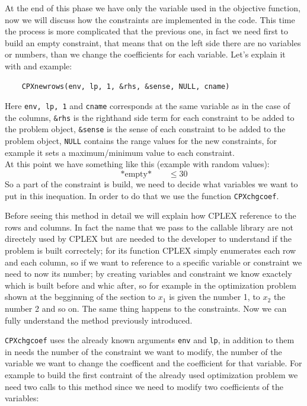At the end of this phase we have only the variable used in the objective function, now we will discuss how the constraints are implemented in the code. This time the process is more complicated that the previous one, in fact we need first to build an empty constraint, that means that on the left side there are no variables or numbers, than we change the coefficients for each variable. Let's explain it with and example:

\begin{lstlisting}
	CPXnewrows(env, lp, 1, &rhs, &sense, NULL, cname)
\end{lstlisting}

Here \verb|env, lp, 1| and \verb|cname| corresponds at the same variable as in the case of the columns, \verb|&rhs| is the righthand side term for each constraint to be added to the problem object, \verb|&sense| is the sense of each constraint to be added to the problem object, \verb|NULL| contains the range values for the new constraints, for example it sets a maximum/minimum value to each constraint.\\
At this point we have something like this (example with random values):
\[ \text{*empty*} \qquad \le 30\]
So a part of the constraint is build, we need to decide what variables we want to put in this inequation. In order to do that we use the function \verb|CPXchgcoef|. 

Before seeing this method in detail we will explain how CPLEX reference to the rows and columns. In fact the name that we pass to the callable library are not directely used by CPLEX but are needed to the developer to understand if the problem is built correctely; for its function CPLEX simply enumerates each row and each column, so if we want to reference to a specific variable or constraint we need to now its number; by creating variables and constraint we know exactely which is built before and whic after, so for example in the optimization problem shown at the begginning of the section to $x_1$ is given the number 1, to $x_2$ the number 2 and so on. The same thing happens to the constraints. Now we can fully understand the method previously introduced.

\verb|CPXchgcoef| uses the already known arguments \verb|env| and \verb|lp|, in addition to them in needs the number of the constraint we want to modify, the number of the variable we want to change the coefficent and the coefficient for that variable. For example to build the first contraint of the already used optimization problem we need two calls to this method since we need to modify two coefficients of the variables:


